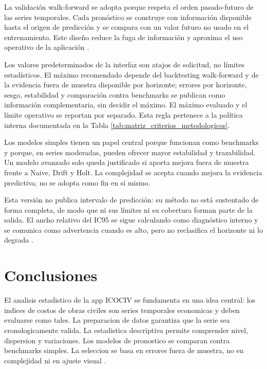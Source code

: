 ﻿\documentclass[12pt,letterpaper]{article}
\newcommand{\ICOCIV}{ICOCIV}
\begin{document}
La validación walk-forward se adopta porque respeta el orden pasado-futuro de las series temporales. Cada pronóstico se construye con información disponible hasta el origen de predicción y se compara con un valor futuro no usado en el entrenamiento. Este diseño reduce la fuga de información y aproxima el uso operativo de la aplicación \citep{tashman2000,hyndman2021fpp3}.

Los valores predeterminados de la interfaz son atajos de solicitud, no límites estadísticos. El máximo recomendado depende del backtesting walk-forward y de la evidencia fuera de muestra disponible por horizonte; errores por horizonte, sesgo, estabilidad y comparación contra benchmarks se publican como información complementaria, sin decidir el máximo. El máximo evaluado y el límite operativo se reportan por separado. Esta regla pertenece a la política interna documentada en la Tabla \ref{tab:matriz_criterios_metodologicos}.

Los modelos simples tienen un papel central porque funcionan como benchmarks y porque, en series moderadas, pueden ofrecer mayor estabilidad y trazabilidad. Un modelo avanzado solo queda justificado si aporta mejora fuera de muestra frente a Naive, Drift y Holt. La complejidad se acepta cuando mejora la evidencia predictiva; no se adopta como fin en sí mismo.

Esta versión no publica intervalo de predicción: su método no está sustentado de forma completa, de modo que ni sus límites ni su cobertura forman parte de la salida. El ancho relativo del IC95 se sigue calculando como diagnóstico interno y se comunica como advertencia cuando es alto, pero no reclasifica el horizonte ni lo degrada \citep{hyndman2021fpp3}.

\section{Conclusiones}

El analisis estadistico de la app \ICOCIV{} se fundamenta en una idea central: los indices de costos de obras civiles son series temporales economicas y deben evaluarse como tales. La preparacion de datos garantiza que la serie sea cronologicamente valida. La estadistica descriptiva permite comprender nivel, dispersion y variaciones. Los modelos de pronostico se comparan contra benchmarks simples. La seleccion se basa en errores fuera de muestra, no en complejidad ni en ajuste visual \citep{tashman2000,hyndman2021fpp3}.
\end{document}
